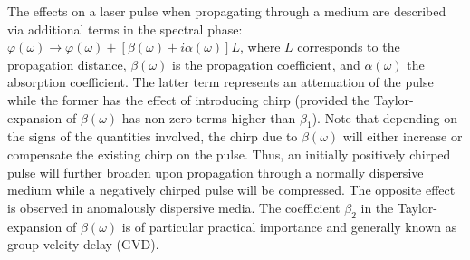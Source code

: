 \documentclass[a4paper]{jpconf}
\begin{document}
The effects on a laser pulse when propagating through a medium are described via additional terms in the spectral phase: $\varphi(\omega) \to \varphi(\omega) + [\beta(\omega) + i \alpha(\omega)]L$, where $L$ corresponds to the propagation distance, $\beta(\omega)$ is the propagation coefficient, and $\alpha(\omega)$ the absorption coefficient. The latter term represents an attenuation of the pulse while the former has the effect of introducing chirp (provided the Taylor-expansion of $\beta(\omega)$ has non-zero terms higher than $\beta_1$). Note that depending on the signs of the quantities involved, the chirp due to $\beta(\omega)$ will either increase or compensate the existing chirp on the pulse. Thus, an initially positively chirped pulse will further broaden upon propagation through a normally dispersive medium while a negatively chirped pulse will be compressed. The opposite effect is observed in anomalously dispersive media. The coefficient $\beta_2$ in the Taylor-expansion of $\beta(\omega)$ is of particular practical importance and generally known as group velcity delay (GVD).
\end{document}
